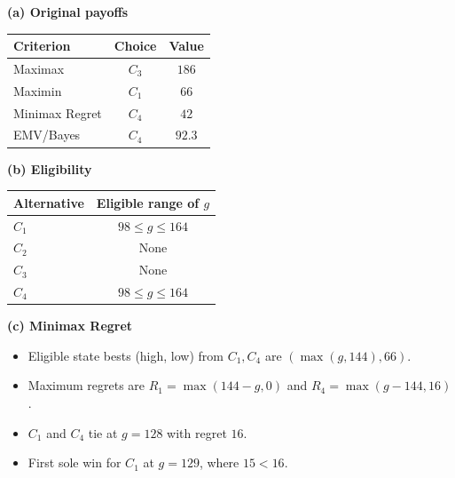 {\noindent\begin{minipage}[t]{0.35\textwidth}
  \vspace{0pt}
  \textbf{(a) Original payoffs}\par\smallskip
  \setlength{\tabcolsep}{3pt}
  \begin{tabular}{@{}lcc@{}}
    \toprule
    Criterion & Choice & Value\\ \midrule
    Maximax & $C_3$ & $186$\\
    Maximin & $C_1$ & $66$\\
    Minimax Regret & $C_4$ & $42$\\
    EMV/Bayes & $C_4$ & $92.3$\\
    \bottomrule
  \end{tabular}
\end{minipage}\hfill
\begin{minipage}[t]{0.62\textwidth}
  \vspace{0pt}
  \textbf{(b) Eligibility}\par\smallskip
  \begin{tabular}{@{}lc@{}}
    \toprule
    Alternative & Eligible range of $g$\\ \midrule
    $C_1$ & $98\le g\le164$\\
    $C_2$ & None\\
    $C_3$ & None\\
    $C_4$ & $98\le g\le164$\\
    \bottomrule
  \end{tabular}\par\smallskip
  \textbf{(c) Minimax Regret}
  \begin{itemize}[leftmargin=*,nosep]
    \item Eligible state bests (high, low) from $C_1,C_4$ are $(\max(g,144),66)$.
    \item Maximum regrets are $R_1=\max(144-g,0)$ and $R_4=\max(g-144,16)$.
    \item $C_1$ and $C_4$ tie at $g=128$ with regret $16$.
    \item First sole win for $C_1$ at $\boxed{g=129}$, where $15<16$.
  \end{itemize}
\end{minipage}

}
